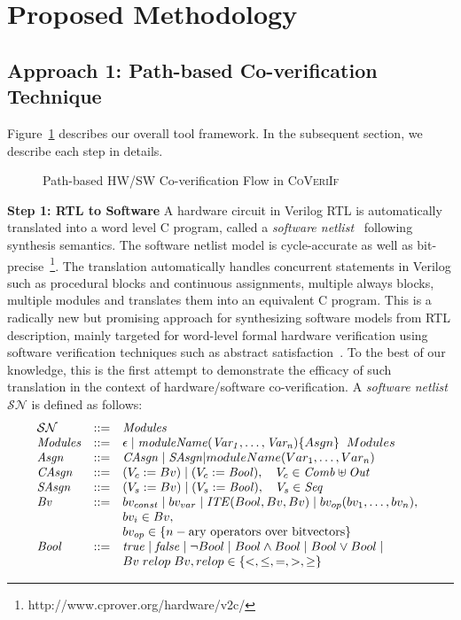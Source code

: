 \documentclass[sigconf]{acmart}
\newcommand{\tool}[1]{\textsc{#1}\xspace}
\newcommand{\verifox}{\tool{CoVeriIf}}
\begin{document}
\section{Proposed Methodology}
%
\subsection{Approach 1: Path-based Co-verification Technique}
%
Figure~\ref{proposed-flow} describes our overall tool framework. In the
subsequent section, we describe each step in details.\\ 
%
\begin{figure}[t]
{}
\caption{Path-based HW/SW Co-verification Flow in \verifox
\label{proposed-flow}}
\end{figure}
%
\textbf{Step 1: RTL to Software}
A hardware circuit in Verilog RTL is automatically 
translated into a word level C program, called a 
\textit{software netlist}~\cite{mtk2016,mskm2016,mkm2015} following synthesis 
semantics. The software netlist model is cycle-accurate as well as 
bit-precise~\footnote{http://www.cprover.org/hardware/v2c/}. The 
translation automatically handles concurrent statements 
in Verilog such as procedural blocks and continuous assignments, multiple always
blocks, multiple modules and translates them into an equivalent C program.  This
is a radically new but promising approach for synthesizing software 
models from RTL description, mainly targeted for word-level formal hardware 
verification using software verification techniques such as abstract 
satisfaction~\cite{leo-thesis}.  To the best of our knowledge, this is the first 
attempt to demonstrate the efficacy of such translation in the context of 
hardware/software co-verification. 
% 
A \textit{software netlist} $\mathcal{SN}$ is defined as follows:
%
\[ 
\begin{array}[t]{@{}lll}
\mathcal{SN} & {:}{:}{=} & \mathit{Modules} \\
\mathit{Modules} & {:}{:}{=} & \epsilon \mid \mathit{moduleName(Var_1,\dots,Var_n)} \{ Asgn \} \;\; Modules \\
\mathit{Asgn} &  {:}{:}{=} & \mathit{CAsgn} \mid \mathit{SAsgn} | moduleName(Var_1,\dots,Var_n)\\
\mathit{CAsgn} & {:}{:}{=} & (V_c := Bv) \mid (V_c := \mathit{Bool}), \quad V_c \in \mathit{Comb} \uplus \mathit{Out} \\
\mathit{SAsgn} & {:}{:}{=} & (V_s := Bv) \mid (V_s := \mathit{Bool}), \quad V_s \in \mathit{Seq} \\
\mathit{Bv} &  {:}{:}{=} & bv_{const} \mid bv_{var} \mid
	\mathit{ITE}(Bool, Bv, Bv) \mid
bv_{op}(bv_1, \ldots, bv_n), \\
& & bv_i \in Bv, \\ 
& & bv_{op} \in \{n-\text{ary operators over bitvectors} \} \\
\mathit{Bool} & {:}{:}{=} & \mathit{true} \mid \mathit{false} \mid \neg{Bool} \mid Bool \land Bool \mid 
Bool \lor Bool \mid \\ 
& & Bv\; relop\; Bv, relop \in \{<,\leq,=,>,\geq\} \\
\end{array}
\]
\end{document}

